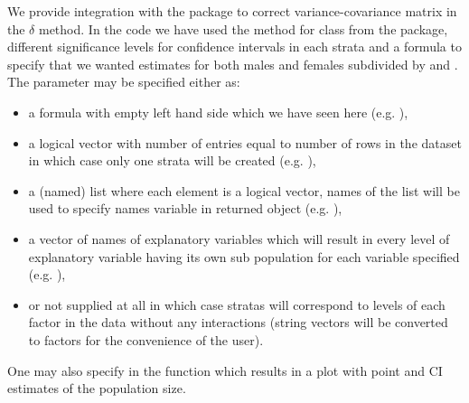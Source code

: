 \documentclass[
]{jss}
\newcommand{\1}{\mathcal{I}} \newcommand{\bZero}{\boldsymbol{0}}
\begin{document}
We provide integration with the  \citep{sandwich} package
to correct variance-covariance matrix in the \(\delta\) method. In the
code we have used the  method for
 class from the  package,
different significance levels for confidence intervals in each strata
and a formula to specify that we wanted estimates for both males and
females subdivided by  and . The 
parameter may be specified either as:

\begin{itemize}
\item a formula with empty left hand side which we have seen here (e.g. ),
\item a logical vector with number of entries equal to number of rows in the dataset in which case only one strata will be created (e.g. ),
\item a (named) list where each element is a logical vector, names of the list will be used to specify names variable in returned object (e.g. ),
\item a vector of names of explanatory variables which will result in every level of explanatory variable having its own sub population for each variable specified (e.g. ),
\item or not supplied at all in which case stratas will correspond to levels of each factor in the data without any interactions (string vectors will be converted to factors for the convenience of the user).
\end{itemize}

One may also specify  in the 
function which results in a plot with point and CI estimates of the
population size.
\end{document}
